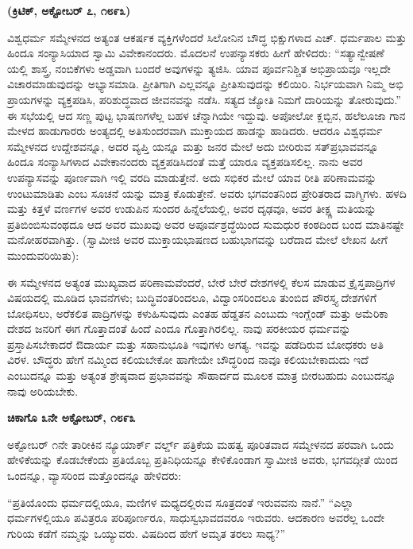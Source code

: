 \begin{center}
\textbf{(ಕ್ರಿಟಿಕ್​, ಅಕ್ಟೋಬರ್​ ೭, ೧೮೯೩)}
\end{center}

ವಿಶ್ವಧರ್ಮ ಸಮ್ಮೇಳನದ ಅತ್ಯಂತ ಆಕರ್ಷಕ ವ್ಯಕ್ತಿಗಳೆಂದರೆ ಸಿಲೋನಿನ ಬೌದ್ಧ ಭಿಕ್ಷುಗಳಾದ ಎಚ್​. ಧರ್ಮಪಾಲ ಮತ್ತು ಹಿಂದೂ ಸಂನ್ಯಾಸಿಯಾದ ಸ್ವಾಮಿ ವಿವೇಕಾನಂದರು. ಮೊದಲನೆ ಉಪನ್ಯಾಸಕರು ಹೀಗೆ ಹೇಳಿದರು: “ಸತ್ಯಾನ್ವೇಷಣೆ ಯಲ್ಲಿ ಶಾಸ್ತ್ರ, ನಂಬಿಕೆಗಳು ಅಡ್ಡವಾಗಿ ಬಂದರೆ ಅವುಗಳನ್ನು ತ್ಯಜಿಸಿ. ಯಾವ ಪೂರ್ವನಿಶ್ಚಿತ ಅಭಿಪ್ರಾಯವೂ ಇಲ್ಲದೇ ವಿಚಾರಮಾಡುವುದನ್ನು ಅಭ್ಯಾಸಮಾಡಿ. ಪ್ರೀತಿಗಾಗಿ ಎಲ್ಲವನ್ನೂ ಪ್ರೀತಿಸುವುದನ್ನು ಕಲಿಯಿರಿ. ನಿರ್ಭಯವಾಗಿ ನಿಮ್ಮ ಅಭಿ ಪ್ರಾಯಗಳನ್ನು ವ್ಯಕ್ತಪಡಿಸಿ, ಪರಿಶುದ್ಧವಾದ ಜೀವನವನ್ನು ನಡೆಸಿ. ಸತ್ಯದ ಜ್ಯೋತಿ ನಿಮಗೆ ದಾರಿಯನ್ನು ತೋರುವುದು.” ಈ ಸಭೆಯಲ್ಲಿ ಆದ ಸಣ್ಣ ಪುಟ್ಟ ಭಾಷಣಗಳೆಲ್ಲ ಬಹಳ ಚೆನ್ನಾಗಿಯೇ ಇದ್ದುವು. ಅಪೋಲೋ ಕ್ಲಬ್ಬಿನ, ಹಲೆಲೂಜಾ ಗಾನ ಮೇಳದ ಹಾಡುಗಾರರು ಅಂತ್ಯದಲ್ಲಿ ಅತಿಸುಂದರವಾಗಿ ಮುಕ್ತಾಯದ ಹಾಡನ್ನು ಹಾಡಿದರು. ಆದರೂ ವಿಶ್ವಧರ್ಮ ಸಮ್ಮೇಳನದ ಉದ್ದೇಶವನ್ನೂ, ಅದರ ವ್ಯಪ್ತಿ ಯನ್ನೂ ಮತ್ತು ಜನರ ಮೇಲೆ ಅದು ಬೀರಿರುವ ಸತ್​ಪ್ರಭಾವವನ್ನೂ ಹಿಂದೂ ಸಂನ್ಯಾಸಿಗಳಾದ ವಿವೇಕಾನಂದರು ವ್ಯಕ್ತಪಡಿಸಿದಂತೆ ಮತ್ತೆ ಯಾರೂ ವ್ಯಕ್ತಪಡಿಸಲಿಲ್ಲ. ನಾನು ಅವರ ಉಪನ್ಯಾಸವನ್ನು ಪೂರ್ಣವಾಗಿ ಇಲ್ಲಿ ವರದಿ ಮಾಡುತ್ತೇನೆ. ಅದು ಸಭಿಕರ ಮೇಲೆ ಯಾವ ರೀತಿ ಪರಿಣಾಮವನ್ನು ಉಂಟುಮಾಡಿತು ಎಂಬ ಸೂಚನೆ ಯನ್ನು ಮಾತ್ರ ಕೊಡುತ್ತೇನೆ. ಅವರು ಭಗವಂತನಿಂದ ಪ್ರೇರಿತರಾದ ವಾಗ್ಮಿಗಳು. ಹಳದಿ ಮತ್ತು ಕಿತ್ತಳೆ ವರ್ಣಗಳ ಅವರ ಉಡುಪಿನ ಸುಂದರ ಹಿನ್ನೆಲೆಯಲ್ಲಿ, ಅವರ ದೃಢವೂ, ಅವರ ತೀಕ್ಷ್ಣ ಮತಿಯನ್ನು ಪ್ರತಿಬಿಂಬಿಸುವಂಥದೂ ಆದ ಅವರ ಮುಖವು ಅವರ ಅಪೂರ್ವಶ್ರದ್ಧೆಯಿಂದ ಸುಮಧುರ ಕಂಠದಿಂದ ಬಂದ ಮಾತಿನಷ್ಟೇ ಮನೋಹರವಾಗಿತ್ತು. (ಸ್ವಾಮೀಜಿ ಅವರ ಮುಕ್ತಾಯಭಾಷಣದ ಬಹುಭಾಗವನ್ನು ಬರೆದಾದ ಮೇಲೆ ಲೇಖನ ಹೀಗೆ ಮುಂದುವರಿಯಿತು):

ಈ ಸಮ್ಮೇಳನದ ಅತ್ಯಂತ ಮುಖ್ಯವಾದ ಪರಿಣಾಮವೆಂದರೆ, ಬೇರೆ ಬೇರೆ ದೇಶಗಳಲ್ಲಿ ಕೆಲಸ ಮಾಡುವ ಕ್ರೈಸ್ತಪಾದ್ರಿಗಳ ವಿಷಯದಲ್ಲಿ ಮೂಡಿದ ಭಾವನೆಗಳು; ಬುದ್ಧಿವಂತರಿಂದಲೂ, ವಿದ್ವಾಂಸರಿಂದಲೂ ತುಂಬಿದ ಪೌರಸ್ತ್ಯ ದೇಶಗಳಿಗೆ ಬೋಧಿಸಲು, ಅರೆಕಲಿತ ಪಾದ್ರಿಗಳನ್ನು ಕಳುಹಿಸುವುದು ಎಂತಹ ಹೆಡ್ಡತನ ಎಂಬುದು ಇಂಗ್ಲೆಂಡ್​ ಮತ್ತು ಅಮೆರಿಕಾ ದೇಶದ ಜನರಿಗೆ ಈಗ ಗೊತ್ತಾದಂತೆ ಹಿಂದೆ ಎಂದೂ ಗೊತ್ತಾಗಿರಲಿಲ್ಲ. ನಾವು ಪರಕೀಯರ ಧರ್ಮವನ್ನು ಪ್ರಸ್ತಾಪಿಸಬೇಕಾದರೆ ಔದಾರ್ಯ ಮತ್ತು ಸಹಾನುಭೂತಿ ಇವುಗಳು ಅಗತ್ಯ. ಇವನ್ನು ಪಡೆದಿರುವ ಬೋಧಕರು ಅತಿ ವಿರಳ. ಬೌದ್ಧರು ಹೇಗೆ ನಮ್ಮಿಂದ ಕಲಿಯಬೇಕೋ ಹಾಗೇಯೇ ಬೌದ್ಧರಿಂದ ನಾವೂ ಕಲಿಯಬೇಕಾದುದು ಇದೆ ಎಂಬುದನ್ನೂ ಮತ್ತು ಅತ್ಯಂತ ಶ್ರೇಷ್ಠವಾದ ಪ್ರಭಾವವನ್ನು ಸೌಹಾರ್ದದ ಮೂಲಕ ಮಾತ್ರ ಬೀರಬಹುದು ಎಂಬುದನ್ನೂ ನಾವು ಅರಿಯಬೇಕು.

\delimiter

\textbf{ಚಿಕಾಗೊ ೩ನೇ ಅಕ್ಟೋಬರ್​, ೧೮೯೩} 

ಅಕ್ಟೋಬರ್​ ೧ನೇ ತಾರೀಕಿನ ನ್ಯೂಯಾರ್ಕ್​ ವರ್ಲ್ಡ್​ ಪತ್ರಿಕೆಯ ಮಹತ್ವ ಪೂರಿತವಾದ ಸಮ್ಮೇಳನದ ಪರವಾಗಿ ಒಂದು ಹೇಳಿಕೆಯನ್ನು ಕೊಡಬೇಕೆಂದು ಪ್ರತಿಯೊಬ್ಬ ಪ್ರತಿನಿಧಿಯನ್ನೂ ಕೇಳಿಕೊಂಡಾಗ ಸ್ವಾಮೀಜಿ ಅವರು, ಭಗವದ್ಗೀತೆ ಯಿಂದ ಒಂದನ್ನೂ, ವ್ಯಾಸರಿಂದ ಮತ್ತೊಂದನ್ನೂ ಹೇಳಿದರು:

“ಪ್ರತಿಯೊಂದು ಧರ್ಮದಲ್ಲಿಯೂ, ಮಣಿಗಳ ಮಧ್ಯದಲ್ಲಿರುವ ಸೂತ್ರದಂತೆ ಇರುವವನು ನಾನೆ.” “ಎಲ್ಲಾ ಧರ್ಮಗಳಲ್ಲಿಯೂ ಪವಿತ್ರರೂ ಪರಿಪೂರ್ಣರೂ, ಸಾಧುಸ್ವಭಾವದವರೂ ಇರುವರು. ಆದಕಾರಣ ಅವರೆಲ್ಲ ಒಂದೇ ಗುರಿಯ ಕಡೆಗೆ ನಮ್ಮನ್ನು ಒಯ್ಯುವರು. ವಿಷದಿಂದ ಹೇಗೆ ಅಮೃತ ತರಲು ಸಾಧ್ಯ?”

